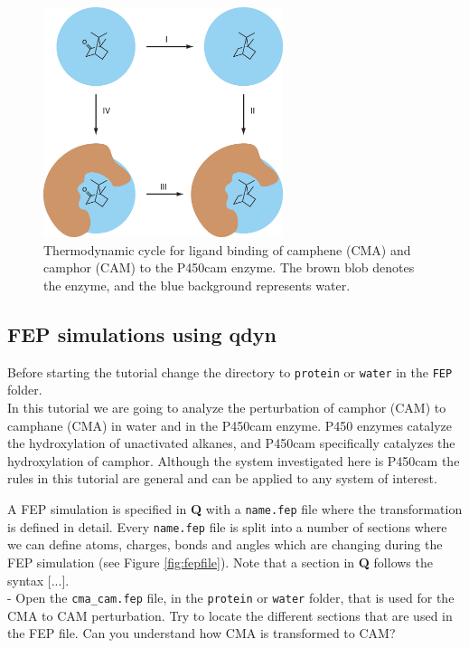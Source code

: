 \documentclass[10pt,oneside,pdftex]{article}
\begin{document}
\begin{figure}
\centering
\includegraphics[width=7cm]{images/lie.eps}
\caption{\label{fig:fep}  Thermodynamic cycle  for  ligand binding  of
  camphene (CMA)  and camphor (CAM)  to the P450cam enzyme.  The brown
  blob denotes the enzyme, and the blue background represents water.}
\end{figure}
\newpage

\subsection{FEP simulations using \textbf{qdyn}}

Before starting the tutorial change the directory to \texttt{protein}
or \texttt{water} in the \texttt{FEP} folder.\\

In this tutorial  we are going to analyze the  perturbation of camphor
(CAM) to  camphane (CMA)  in water  and in  the P450cam  enzyme.  P450
enzymes catalyze the hydroxylation of unactivated alkanes, and P450cam
specifically  catalyzes the  hydroxylation of  camphor.  Although  the
system investigated  here is  P450cam the rules  in this  tutorial are
general and can be applied to any system of interest.

A FEP simulation  is specified in \textbf{Q}  with a \texttt{name.fep}
file   where  the   transformation  is   defined  in   detail.   Every
\texttt{name.fep} file is split into a number of sections where we can
define atoms, charges, bonds and  angles which are changing during the
FEP simulation (see Figure \ref{fig:fepfile}).  Note that a section in
\textbf{Q} follows the syntax $[$...$]$.\\

-  Open   the  \texttt{cma\_cam.fep} file,   in  the   \texttt{protein}  or
\texttt{water}   folder,   that  is   used   for   the  CMA   to   CAM
perturbation. Try  to locate the  different sections that are  used in
the FEP file. Can you understand how CMA is transformed to CAM?\\
\end{document}
